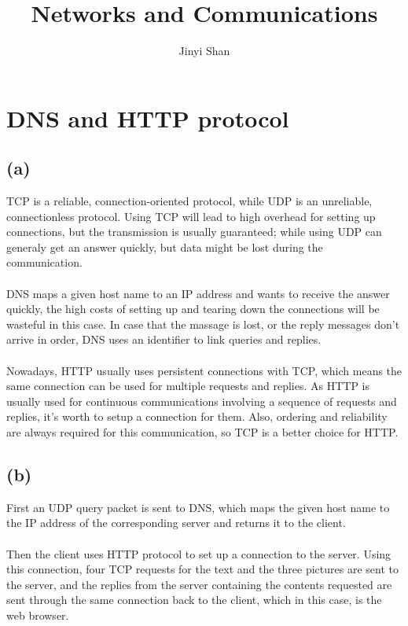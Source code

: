 \documentclass[12pt, a4paper]{article}
\title{\Huge Networks and Communications}
\author{Jinyi Shan}
\begin{document}
\maketitle


\section{DNS and HTTP protocol}

\subsection*{(a)}
TCP is a reliable, connection-oriented protocol, while UDP is an unreliable, connectionless protocol. Using TCP will lead to high overhead for setting up connections, but the transmission is usually guaranteed; while using UDP can generaly get an answer quickly, but data might be lost during the communication. \\
\\
DNS maps a given host name to an IP address and wants to receive the answer quickly, the high costs of setting up and tearing down the connections will be wasteful in this case. In case that the massage is lost, or the reply messages don't arrive in order, DNS uses an identifier to link queries and replies.
\\ \\
Nowadays, HTTP usually uses persistent connections with TCP, which means the same connection can be used for multiple requests and replies. As HTTP is usually used for continuous communications involving a sequence of requests and replies, it's worth to setup a connection for them. Also, ordering and reliability are always required for this communication, so TCP is a better choice for HTTP.

\subsection*{(b)}
First an UDP query packet is sent to DNS, which maps the given host name to the IP address of the corresponding server and returns it to the client.  \\ \\
Then the client uses HTTP protocol to set up a connection to the server. Using this connection, four TCP requests for the text and the three pictures are sent to the server, and the replies from the server containing the contents requested are sent through the same connection back to the client, which in this case, is the web browser.
\end{document}
